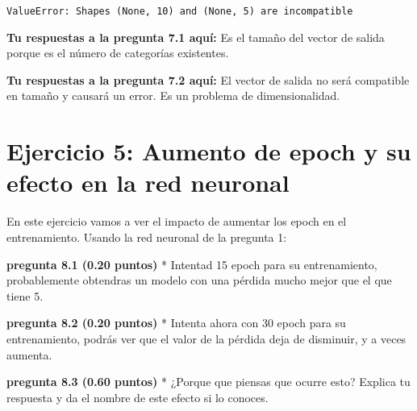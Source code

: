 \documentclass[12pt,a4paper,table]{article}
\begin{document}
\begin{Verbatim}[commandchars=\\\{\}, frame=single, framerule=2mm, rulecolor=\color{outerrorbackground}]
    ValueError: Shapes (None, 10) and (None, 5) are incompatible

    \end{Verbatim}

    \textbf{Tu respuestas a la pregunta 7.1 aquí:} Es el tamaño del vector de salida
porque es el número de categorías existentes.

    \textbf{Tu respuestas a la pregunta 7.2 aquí:} El vector de salida no será
compatible en tamaño y causará un error. Es un problema de
dimensionalidad.

    \hypertarget{ejercicio-5-aumento-de-epoch-y-su-efecto-en-la-red-neuronal}{%
\section{Ejercicio 5: Aumento de epoch y su efecto en la red
neuronal}\label{ejercicio-5-aumento-de-epoch-y-su-efecto-en-la-red-neuronal}}

En este ejercicio vamos a ver el impacto de aumentar los epoch en el
entrenamiento. Usando la red neuronal de la pregunta 1:

\textbf{pregunta 8.1 (0.20 puntos)} * Intentad 15 epoch para su
entrenamiento, probablemente obtendras un modelo con una pérdida mucho
mejor que el que tiene 5.

\textbf{pregunta 8.2 (0.20 puntos)} * Intenta ahora con 30 epoch para su
entrenamiento, podrás ver que el valor de la pérdida deja de disminuir,
y a veces aumenta.

\textbf{pregunta 8.3 (0.60 puntos)} * ¿Porque que piensas que ocurre
esto? Explica tu respuesta y da el nombre de este efecto si lo conoces.
\end{document}
